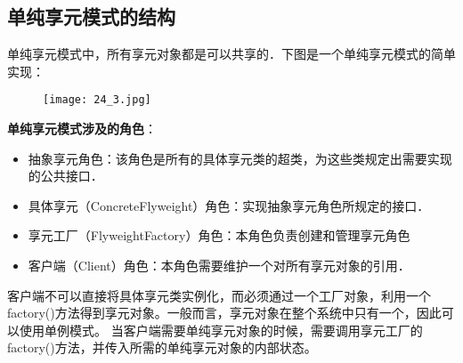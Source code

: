 \documentclass[../main.tex]{subfiles}
\begin{document}
\subsection{单纯享元模式的结构}
\noindent 单纯享元模式中，所有享元对象都是可以共享的．下图是一个单纯享元模式的简单实现：
%
\begin{figure}[H]
  \texttt{[image: 24\_3.jpg]}
\end{figure}
%
\textbf{单纯享元模式涉及的角色}：
\begin{itemize}
  \item 抽象享元角色：该角色是所有的具体享元类的超类，为这些类规定出需要实现的公共接口．
  \item 具体享元（ConcreteFlyweight）角色：实现抽象享元角色所规定的接口．
  \item 享元工厂（FlyweightFactory）角色：本角色负责创建和管理享元角色
  \item 客户端（Client）角色：本角色需要维护一个对所有享元对象的引用．
\end{itemize}
%


%
客户端不可以直接将具体享元类实例化，而必须通过一个工厂对象，利用一个factory()方法得到享元对象。一般而言，享元对象在整个系统中只有一个，因此可以使用单例模式。
当客户端需要单纯享元对象的时候，需要调用享元工厂的factory()方法，并传入所需的单纯享元对象的内部状态。
%

%
\end{document}
